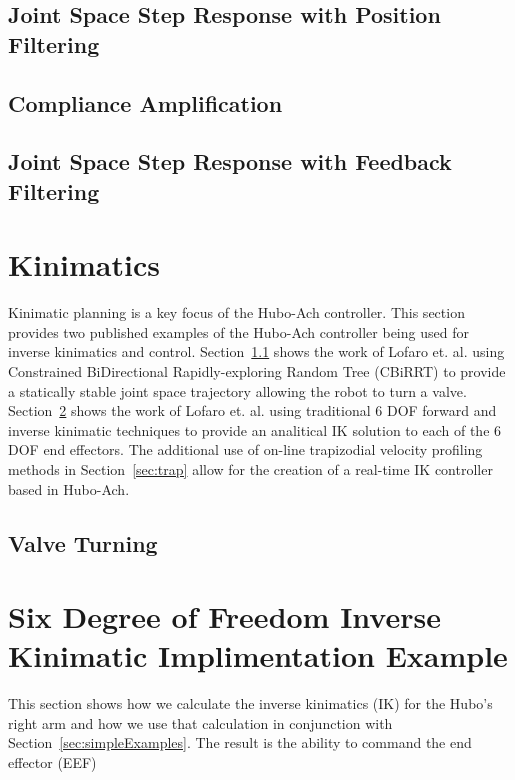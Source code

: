 	\subsection{Joint Space Step Response with Position Filtering}\label{sec:singlejointFilter}
		
	\subsection{Compliance Amplification}\label{sec:singlejointRefComplience}
		
	\subsection{Joint Space Step Response with Feedback Filtering}\label{sec:singlejointEnc}
		

\section{Kinimatics}\label{sec:hubo-ach-kinimatics}
Kinimatic planning is a key focus of the Hubo-Ach controller.
This section provides two published examples of the Hubo-Ach controller being used for inverse kinimatics and control.
Section~\ref{sec:valve} shows the work of Lofaro et. al. \cite{lofaroTePRA2013Valve} using Constrained BiDirectional Rapidly-exploring Random Tree (CBiRRT) to provide a statically stable joint space trajectory allowing the robot to turn a valve.
Section~\ref{sec:6dofik} shows the work of Lofaro et. al. \cite{lofaroTePRA2013HuboAch} using traditional 6 DOF forward and inverse kinimatic techniques to provide an analitical IK solution to each of the 6 DOF end effectors.
The additional use of on-line trapizodial velocity profiling methods in Section~\ref{sec:trap} allow for the creation of a real-time IK controller based in Hubo-Ach.


\subsection{Valve Turning}\label{sec:valve}
	



\section{Six Degree of Freedom Inverse Kinimatic Implimentation Example}\label{sec:6dofik}
This section shows how we calculate the inverse kinimatics (IK) for the Hubo's right arm and how we use that calculation in conjunction with Section~\ref{sec:simpleExamples}.  The result is the ability to command the end effector (EEF)

